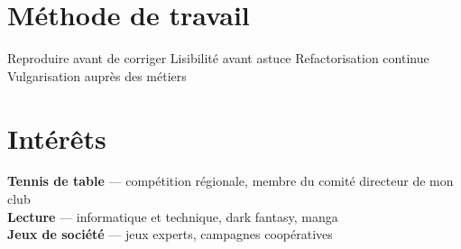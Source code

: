 \section*{ Méthode de travail}
\textcolor{detailcolor}{Reproduire avant de corriger \cvsep Lisibilité avant astuce \cvsep Refactorisation continue \cvsep Vulgarisation auprès des métiers}

\section*{ Intérêts}
\textbf{\color{secondcolor}Tennis de table} \textcolor{detailcolor}{— compétition régionale, membre du comité directeur de mon club}\\[2pt]
\textbf{\color{secondcolor}Lecture} \textcolor{detailcolor}{— informatique et technique, dark fantasy, manga}\\[2pt]
\textbf{\color{secondcolor}Jeux de société} \textcolor{detailcolor}{— jeux experts, campagnes coopératives}
